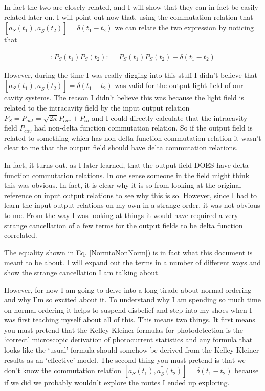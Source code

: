\documentclass[12pt]{article}
\begin{document}
In fact the two are closely related, and I will show that they can in fact be easily related later on. I will point out now that, using the commutation relation that $[a_S(t_1),a_S^{\dag}(t_2)] = \delta(t_1-t_2)$ we can relate the two expression by noticing that

\begin{align}
\label{NormtoNonNorm}
:P_S(t_1)P_S(t_2): = P_S(t_1)P_S(t_2) - \delta(t_1-t_2)
\end{align}

However, during the time I was really digging into this stuff I didn't believe that $[a_S(t_1),a_S^{\dag}(t_2)] = \delta(t_1-t_2)$ was valid for the output light field of our cavity systems. The reason I didn't believe this was because the light field is related to the intracavity field by the input output relation $P_S = P_{out} = \sqrt{2\kappa}P_{cav} + P_{in}$  and I could directly calculate that the intracavity field $P_{cav}$ had non-delta function commutation relation. So if the output field is related to something which has non-delta function commutation relation it wasn't clear to me that the output field should have delta commutation relations. 

In fact, it turns out, as I later learned, that the output field DOES have delta function commutation relations. In one sense someone in the field might think this was obvious. In fact, it is clear why it is so from looking at the original reference on input output relations to see why this is so. However, since I had to learn the input output relations on my own in a strange order, it was not obvious to me. From the way I was looking at things it would have required a very strange cancellation of a few terms for the output fields to be delta function correlated. 

The equality shown in Eq. \ref{NormtoNonNorm}) is in fact what this document is meant to be about. I will expand out the terms in a number of different ways and show the strange cancellation I am talking about.  

However, for now I am going to delve into a long tirade about normal ordering and why I'm so excited about it. To understand why I am spending so much time on normal ordering it helps to suspend disbelief and step into my shoes when I was first teaching myself about all of this. This means two things. It first means you must pretend that the Kelley-Kleiner formulas for photodetection is the `correct' microscopic derivation of photocurrent statistics and any formula that looks like the `usual' formula should somehow be derived from the Kelley-Kleiner results as an `effective' model. The second thing you must pretend is that we don't know the commutation relation $[a_S(t_1),a_S^{\dag}(t_2)] = \delta(t_1-t_2)$ because if we did we probably wouldn't explore the routes I ended up exploring.
\end{document}
